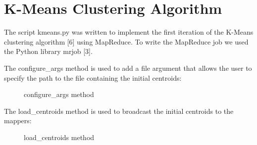 \documentclass[11pt]{article}
\begin{document}
	\newpage
	\section{K-Means Clustering Algorithm}
	
The script kmeans.py was written to implement the first iteration of the K-Means clustering algorithm [6] using MapReduce. To write the MapReduce job we used the Python library mrjob [3].

The configure\_args method is used to add a file argument that allows the user to specify the path to the file containing the initial centroids:

\begin{figure}[H]
		\caption{configure\_args method}
	\end{figure}

	The load\_centroids method is used to broadcast the initial centroids to the mappers:
	
	\begin{figure}[H]
		\caption{load\_centroids method}
	\end{figure}
\end{document}
